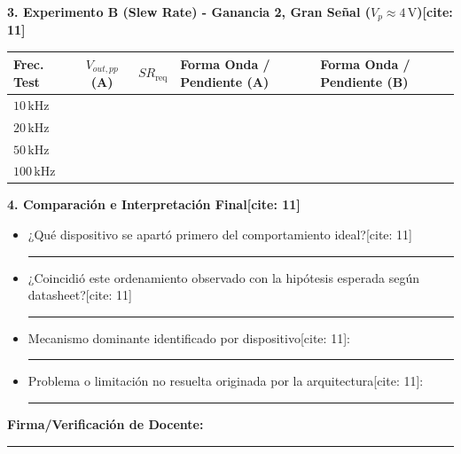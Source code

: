 \documentclass[11pt, a4paper]{article}
\begin{document}
\vspace{0.2cm}
\noindent\textbf{3. Experimento B (Slew Rate) - Ganancia 2, Gran Señal ($V_p \approx 4\,\text{V}$)[cite: 11]}
\begin{table}[h!]
    \centering
    \footnotesize
    \renewcommand{\arraystretch}{1.3}
    \begin{tabularx}{\textwidth}{|>{\raggedright\arraybackslash\hsize=1.0\hsize}X|c|c|X|X|}
    \hline
    \textbf{Frec. Test} & \textbf{$V_{out,pp}$ (A)} & \textbf{$SR_{\mathrm{req}}$} & \textbf{Forma Onda / Pendiente (A)} & \textbf{Forma Onda / Pendiente (B)} \\ \hline
    $10\,\text{kHz}$ & & & & \\ \hline
    $20\,\text{kHz}$ & & & & \\ \hline
    $50\,\text{kHz}$ & & & & \\ \hline
    $100\,\text{kHz}$ & & & & \\ \hline
    \end{tabularx}
\end{table}

\vspace{0.2cm}
\noindent\textbf{4. Comparación e Interpretación Final[cite: 11]}
\begin{itemize}
    \setlength{\itemsep}{0.2cm}
    \item ¿Qué dispositivo se apartó primero del comportamiento ideal?[cite: 11] \\ \rule{\linewidth}{0.4pt}
    \item ¿Coincidió este ordenamiento observado con la hipótesis esperada según datasheet?[cite: 11] \\ \rule{\linewidth}{0.4pt}
    \item Mecanismo dominante identificado por dispositivo[cite: 11]: \\ \rule{\linewidth}{0.4pt}
    \item Problema o limitación no resuelta originada por la arquitectura[cite: 11]: \\ \rule{\linewidth}{0.4pt}
\end{itemize}

\vspace{0.3cm}
\textbf{Firma/Verificación de Docente:} \rule{6cm}{0.4pt}
\end{document}
